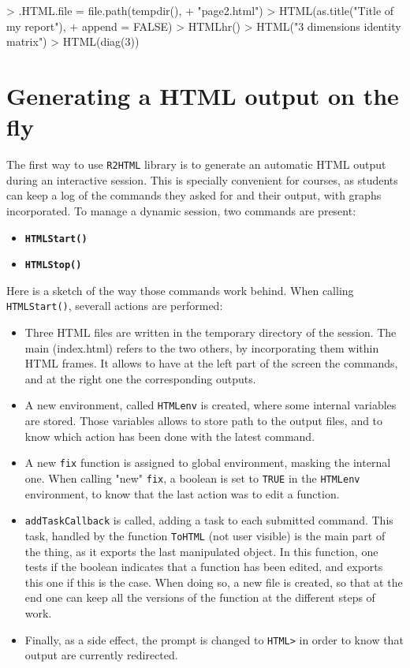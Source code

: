\documentclass[a4paper]{article}
\newcommand{\HTML}{{\tt R2HTML}}
\begin{document}
\begin{Schunk}
\begin{Sinput}
> .HTML.file = file.path(tempdir(), 
+     "page2.html")
> HTML(as.title("Title of my report"), 
+     append = FALSE)
> HTMLhr()
> HTML("3 dimensions identity matrix")
> HTML(diag(3))
\end{Sinput}
\end{Schunk}

\section*{Generating a HTML output on the fly}

The first way to use \HTML{} library is to generate an automatic HTML output during an interactive session. This is specially convenient for courses, as students can keep a log of the commands they asked for and their output, with graphs incorporated. To manage a dynamic session, two commands are present:

\begin{itemize}
\item {\bf \verb+HTMLStart()+} 
\item {\bf \verb+HTMLStop()+} 
\end{itemize}

Here is a sketch of the way those commands work behind. When calling \verb+HTMLStart()+, severall actions are performed:
\begin{itemize}
\item Three HTML files are written in the temporary directory of the session. The main (index.html) refers to the two others, by incorporating them within HTML frames. It allows to have at the left part of the screen the commands, and at the right one the corresponding outputs.
\item A new environment, called \verb+HTMLenv+ is created, where some internal variables are stored. Those variables allows to store path to the output files, and to know which action has been done with the latest command.
\item A new \verb+fix+ function is assigned to global environment, masking the internal one. When calling "new" \verb+fix+, a boolean is set to \verb+TRUE+ in the \verb+HTMLenv+ environment, to know that the last action was to edit a function.
\item \verb+addTaskCallback+ is called, adding a task to each submitted command. This task, handled by the function \verb+ToHTML+ (not user visible) is the main part of the thing, as it exports the last manipulated object. In this function, one tests if the boolean indicates that a function has been edited, and exports this one if this is the case. When doing so, a new file is created, so that at the end one can keep all the versions of the function at the different steps of work.
\item Finally, as a side effect, the prompt is changed to \verb+HTML>+ in order to know that output are currently redirected.
\end{itemize}
\end{document}
